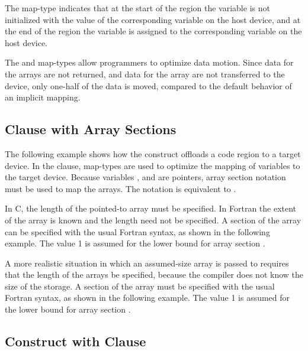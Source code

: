 The  map-type indicates that at the start of the  region 
the variable  is not initialized with the value of the corresponding variable 
on the host device, and at the end of the  region the variable  
is assigned to the corresponding variable on the host device.


The  and  map-types allow programmers to optimize data 
motion. Since data for the  arrays are not returned, and data for the  array 
are not transferred to the device, only one-half of the data is moved, compared 
to the default behavior of an implicit mapping.


\subsection{ Clause with Array Sections}
\label{subsec:target_array_section}

The following example shows how the  construct offloads a code region 
to a target device. In the  clause, map-types are used to optimize 
the mapping of variables to the target device. Because variables ,  and  are 
pointers, array section notation must be used to map the arrays. The notation  
is equivalent to .

\clearpage

In C, the length of the pointed-to array must be specified. In Fortran the extent 
of the array is known and the length need not be specified. A section of the array 
can be specified with the usual Fortran syntax, as shown in the following example. 
The value 1 is assumed for the lower bound for array section .


A more realistic situation in which an assumed-size array is passed to  
requires that the length of the arrays be specified, because the compiler does 
not know the size of the storage. A section of the array must be specified with 
the usual Fortran syntax, as shown in the following example. The value 1 is assumed 
for the lower bound for array section .


\subsection{ Construct with  Clause}
\label{subsec:target_if}

